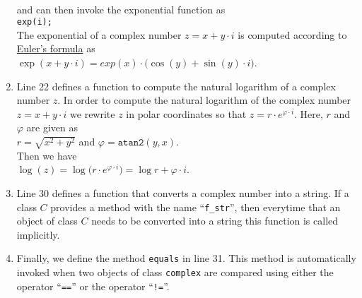 \begin{enumerate}
      \\[0.2cm]
      and can then invoke the exponential function as
      \\[0.2cm]
      \hspace*{1.3cm}
      \texttt{exp(i);}
      \\[0.2cm]
      The exponential of a complex number $z = x + y \cdot i$ is computed according to
      \href{http://en.wikipedia.org/wiki/Euler%27s_formula}{Euler's formula} as
      \\[0.2cm]
      \hspace*{1.3cm}
      $\exp(x + y \cdot i) = exp(x) \cdot \bigl(\cos(y) + \sin(y) \cdot i\bigr)$.
\item Line 22 defines a function to compute the natural logarithm of a complex number $z$.
      In order to compute the natural logarithm of the complex number $z = x + y \cdot i$ we rewrite $z$
      in polar coordinates so that $z = r \cdot e^{\varphi \cdot i}$.   Here, $r$ and
      $\varphi$ are given as
      \\[0.2cm]
      \hspace*{1.3cm}
      $r = \sqrt{x^2 + y^2}$ \quad and \quad $\varphi = \mathtt{atan2}(y, x)$.
      \\[0.2cm]
      Then we have
      \\[0.2cm]
      \hspace*{1.3cm}
      $\log(z) = \log\bigl(r \cdot e^{\varphi \cdot i}\bigr) = \log r + \varphi \cdot i$.
\item Line 30 defines a function that converts a complex number into a string.  If a class
      $C$ provides a method with the name ``\texttt{f\_str}'', then everytime that an object
      of class $C$ needs to be converted into a string this function is called implicitly.

\item Finally, we define the method \texttt{equals} in line 31.  This method is automatically
      invoked when two objects of class \texttt{complex} are compared using either the
      operator ``\texttt{==}'' or the operator ``\texttt{!=}''.
\end{enumerate}


                
 

